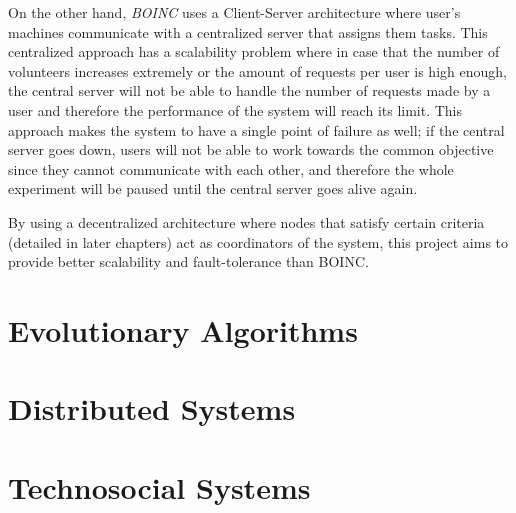 On the other hand, \textit{BOINC} uses a Client-Server architecture where user's machines communicate with a centralized server that assigns them tasks. This centralized approach has a scalability problem where in case that the number of volunteers increases extremely or the amount of requests per user is high enough, the central server will not be able to handle the number of requests made by a user and therefore the performance of the system will reach its limit. This approach makes the system to have a single point of failure as well; if the central server goes down, users will not be able to work towards the common objective since they cannot communicate with each other, and therefore the whole experiment will be paused until the central server goes alive again.  

By using a decentralized architecture where nodes that satisfy certain criteria (detailed in later chapters) act as coordinators of the system, this project aims to provide better scalability and fault-tolerance than BOINC. 



\section{Evolutionary Algorithms}

\section{Distributed Systems}

\section{Technosocial Systems}

